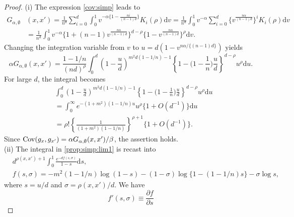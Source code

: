 \documentclass[a4paper,11pt]{article}
\theoremstyle{plain}
\theoremstyle{definition}
\begin{document}
\begin{proof}
  (i) The expression \eqref{cov:simp} leads to
  \begin{align*}
    G_{\alpha,\emptyset}&(x,x')=\frac{1}{n^d}\sum_{i=0}^d
    \int_0^1 v^{-\alpha\big\{1-\frac{ni}{(n-1)d}\big\}}K_i(\rho)
    \mathrm{d}v
    =\frac{1}{n^d}\int_0^1
    v^{-\alpha}\sum_{i=0}^d
    \{v^{\frac{n\alpha}{(n-1)d}}\}^iK_i(\rho)\mathrm{d}v\\
    &=\frac{1}{n^d}
    \int_0^1v^{-\alpha}\big\{1+(n-1)v^{\frac{n\alpha}{(n-1)d}}\big\}^{d-\rho}
    \big\{1-v^{\frac{n\alpha}{(n-1)d}}\big\}^{\rho}\mathrm{d}v.
  \end{align*}
  Changing the integration variable from $v$ to
  $u=d(1-v^{n\alpha/\{(n-1)d\}})$ yields
  \begin{equation}\label{prop:simp:lim1}
    \alpha G_{\alpha,\emptyset}(x,x')
    =\frac{1-1/n}{(nd)^{\rho}}
    \int_0^d \left(1-\frac{u}{d}\right)^{m^2d(1-1/n)-1}
    \left\{1-\Big(1-\frac{1}{n}\Big)\frac{u}{d}\right\}^{d-\rho}
    u^{\rho}
    \mathrm{d}u.
  \end{equation}
  For large $d$, the integral becomes
  \begin{align*}
    &\int_0^d \left(1-\frac{u}{d}\right)^{m^2d(1-1/n)-1}
    \left\{1-\Big(1-\frac{1}{n}\Big)\frac{u}{d}\right\}^{d-\rho}
    u^{\rho}\mathrm{d}u\\
    &=\int_0^\infty e^{-(1+m^2)(1-1/n)u}u^\rho
    \{1+O(d^{-1})\}\mathrm{d}u\\
    &=\rho!\left\{\frac{1}{(1+m^2)(1-1/n)}\right\}^{\rho+1}
    \{1+O(d^{-1})\}.
  \end{align*}
  Since
  ${\rm Cov}(g_x,g_{x'})=\alpha G_{\alpha,\emptyset}(x,x')/\beta$,
  the assertion holds.\\
  (ii) The integral in \eqref{prop:simp:lim1} is recast into
  \begin{align*}
    &d^{\rho(x,x')+1}\int_0^1\frac{e^{-df(s,\sigma)}}{1-s}\mathrm{d}s,
    \\
    &f(s,\sigma)=-m^2(1-1/n)\log(1-s)-(1-\sigma)\log\{1-(1-1/n)s\}
    -\sigma\log s,
  \end{align*}
  where $s=u/d$ and $\sigma=\rho(x,x')/d$. We have
  \[
  f'(s,\sigma)
  \equiv\frac{\partial f}{\partial s}
\]
\end{proof}
\end{document}
